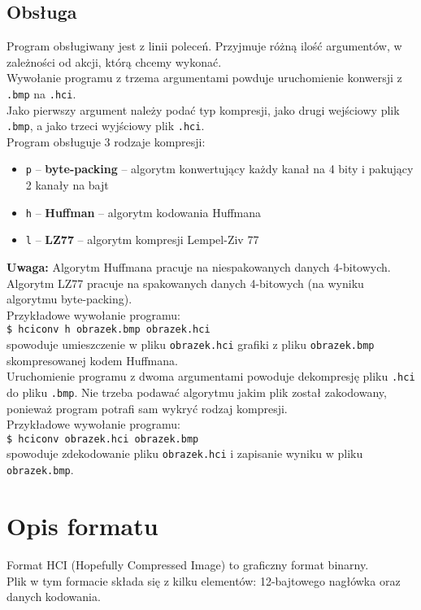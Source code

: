 \documentclass[12pt,a4paper]{article}
\newcommand{\code}[1]{\texttt{#1}}
\newcommand{\note}{\textbf{Uwaga:} }
\begin{document}
		\subsection{Obsługa}
			Program obsługiwany jest z linii poleceń. Przyjmuje różną ilość argumentów, w zależności od akcji, którą chcemy wykonać.\\
			Wywołanie programu z trzema argumentami powduje uruchomienie konwersji z \code{.bmp} na \code{.hci}.\\
			Jako pierwszy argument należy podać typ kompresji, jako drugi wejściowy plik \code{.bmp}, a jako trzeci wyjściowy plik \code{.hci}.\\
			Program obsługuje 3 rodzaje kompresji:
			\begin{itemize}
				\item \code{p} -- \textbf{byte-packing} -- algorytm konwertujący każdy kanał na 4 bity i pakujący 2 kanały na bajt
				\item \code{h} -- \textbf{Huffman} -- algorytm kodowania Huffmana
				\item \code{l} -- \textbf{LZ77} -- algorytm kompresji Lempel-Ziv 77
			\end{itemize}
			\note{
				Algorytm Huffmana pracuje na niespakowanych danych 4-bitowych.\\
				Algorytm LZ77 pracuje na spakowanych danych 4-bitowych (na wyniku algorytmu byte-packing).
			}\\
			Przykładowe wywołanie programu:\\
			\code{\$ hciconv h obrazek.bmp obrazek.hci}\\
			spowoduje umieszczenie w pliku \code{obrazek.hci} grafiki z pliku \code{obrazek.bmp} skompresowanej kodem Huffmana.\\
			Uruchomienie programu z dwoma argumentami powoduje dekompresję pliku \code{.hci} do pliku \code{.bmp}.
			Nie trzeba podawać algorytmu jakim plik został zakodowany, ponieważ program potrafi sam wykryć rodzaj kompresji.\\
			Przykładowe wywołanie programu:\\
			\code{\$ hciconv obrazek.hci obrazek.bmp}\\
			spowoduje zdekodowanie pliku \code{obrazek.hci} i zapisanie wyniku w pliku \code{obrazek.bmp}.

	\section{Opis formatu}
		Format HCI (Hopefully Compressed Image) to graficzny format binarny.\\
		Plik w tym formacie składa się z kilku elementów: 12-bajtowego nagłówka oraz danych kodowania.
\end{document}
